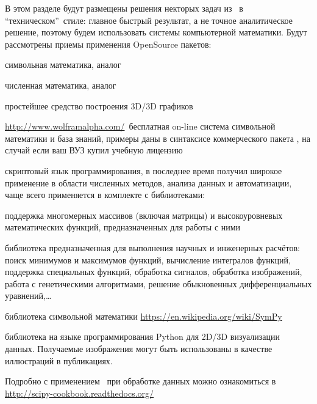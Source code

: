 \secdown

В этом разделе будут размещены решения некторых задач из \cite{danko}\ в
``техническом''\ стиле: главное быстрый результат, а не точное
аналитическое решение, поэтому будем использовать системы компьютерной
математики.
Будут рассмотрены приемы применения OpenSource пакетов:

\begin{description}[nosep]
  \item[\maxima] \cite{maxima} символьная математика, аналог
  \item[\octave] \cite{octave} численная математика, аналог 
  \item[\gnuplot] \cite{gnuplot} простейшее средство построения 3D/3D
  графиков
  \item[\wolfram] \url{http://www.wolframalpha.com/}\ бесплатная on-line
  система символьной математики и база знаний, примеры даны в синтаксисе
  коммерческого пакета , на случай если ваш ВУЗ купил учебную
  лицензию
  \item[\py] скриптовый язык программирования, в последнее время получил широкое
  применение в области численных методов, анализа данных и автоматизации,
  чаще всего применяется в комплекте с библиотеками:
\begin{description}[nosep]
\item[\prog{NumPy}] поддержка многомерных массивов (включая матрицы) и 
высокоуровневых математических функций, предназначенных для работы с ними
\item[\prog{SciPy}] библиотека предназначенная для выполнения научных и
инженерных расчётов: поиск минимумов и максимумов функций,
вычисление интегралов функций,
поддержка специальных функций,
обработка сигналов,
обработка изображений,
работа с генетическими алгоритмами,
решение обыкновенных дифференциальных уравнений,\ldots
\item[\prog{SymPy}] библиотека символьной
математики \url{https://en.wikipedia.org/wiki/SymPy}
\item[\prog{Matplotlib}] библиотека на языке программирования Python для
2D/3D визуализации данных.
Получаемые изображения могут быть использованы в качестве
иллюстраций в публикациях.
\end{description}
Подробно с применением \py\ при обработке
данных можно ознакомиться в \url{http://scipy-cookbook.readthedocs.org/}
\end{description}

